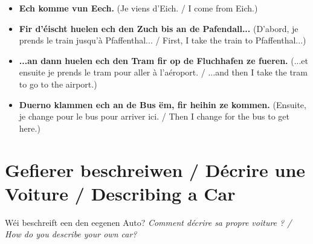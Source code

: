 \begin{itemize}
    \item \textbf{Ech komme vun Eech.} (Je viens d'Eich. / I come from Eich.)
    \item \textbf{Fir d'éischt huelen ech den Zuch bis an de Pafendall...} (D'abord, je prends le train jusqu'à Pfaffenthal... / First, I take the train to Pfaffenthal...)
    \item \textbf{...an dann huelen ech den Tram fir op de Fluchhafen ze fueren.} (...et ensuite je prends le tram pour aller à l'aéroport. / ...and then I take the tram to go to the airport.)
    \item \textbf{Duerno klammen ech an de Bus ëm, fir heihin ze kommen.} (Ensuite, je change pour le bus pour arriver ici. / Then I change for the bus to get here.)
\end{itemize}

\vspace{1cm}

\section{Gefierer beschreiwen / Décrire une Voiture / Describing a Car}

Wéi beschreift een den eegenen Auto? \textit{Comment décrire sa propre voiture ? / How do you describe your own car?}

